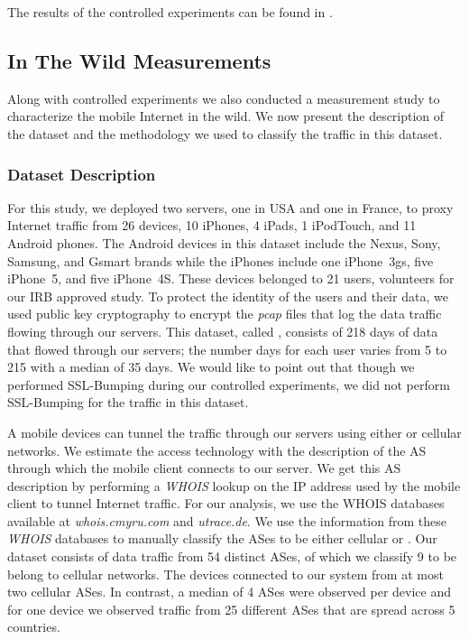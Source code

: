 The results of the controlled experiments can be found in .

\subsection{In The Wild Measurements}

Along with controlled experiments we also conducted a measurement study to characterize the mobile Internet in the wild.
We now present the description of the dataset and the methodology we used to classify the traffic in this dataset.

\subsubsection{Dataset Description}

For this study, we deployed two \platname servers, one in USA and one in France, to proxy Internet traffic from 26 devices, 10 iPhones, 4 iPads, 1 iPodTouch, and 11 Android phones.
The Android devices in this dataset include the Nexus, Sony, Samsung, and Gsmart brands while the iPhones include one iPhone~3gs, five iPhone~5, and five iPhone~4S.
These devices belonged to 21 users, volunteers for our IRB approved study.
To protect the identity of the users and their data, we used public key cryptography to encrypt the \emph{pcap} files that log the data traffic flowing through our \platname servers. 
This dataset, called \mobWild, consists of 218 days of data that flowed through our \platname servers; the number days for each user varies from 5 to 215 with a median of 35 days.
We would like to point out that though we performed SSL-Bumping during our controlled experiments, we did not perform SSL-Bumping for the traffic in this dataset.

A mobile devices can tunnel the traffic through our \platname servers using either \wifi or cellular networks. 
We estimate the access technology with the description of the AS through which the mobile client connects to our \platname server. 
We get this AS description by performing a \emph{WHOIS} lookup on the IP address used by the mobile client to tunnel Internet traffic. 
For our analysis, we use the WHOIS databases available at \emph{whois.cmyru.com} and \emph{utrace.de}.
We use the information from these \emph{WHOIS} databases to manually classify the ASes to be either cellular or \wifi.
Our dataset consists of data traffic from 54 distinct ASes, of which we classify 9 to be belong to cellular networks.
The devices connected to our system from at most two cellular ASes.
In contrast, a median of 4 \wifi ASes were observed per device and for one device we observed traffic from 25 different \wifi ASes that are spread across 5 countries. 



